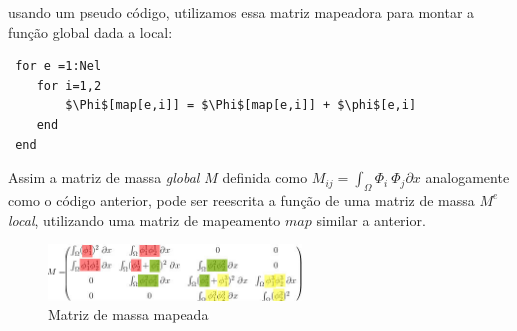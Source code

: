usando um pseudo código, utilizamos essa matriz mapeadora para montar a função global dada a local:
\begin{lstlisting}
 for e =1:Nel
 	for i=1,2
 		$\Phi$[map[e,i]] = $\Phi$[map[e,i]] + $\phi$[e,i]
 	end
 end
\end{lstlisting}
Assim a matriz de massa \emph{global} $M$ definida como $M_{ij} = \int_\Omega \Phi_i\ \Phi_j \partial x$ analogamente como  o código anterior, pode ser reescrita a função de uma matriz de massa $M^e$ \emph{local}, utilizando uma matriz de mapeamento $map$ similar a anterior.
\begin{figure}[!h]
\includegraphics[width=0.6\textwidth, center ]{figuras/Matrix_element.png}
\caption{Matriz de massa mapeada}
\end{figure}